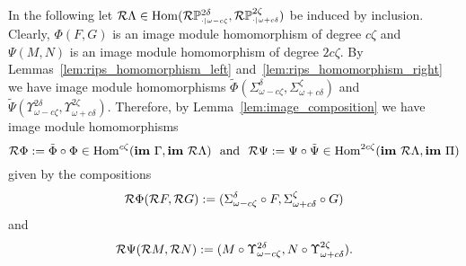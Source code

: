 In the following let $\mathcal{R}\Lambda\in\mathrm{Hom}(\mathcal{R}\mathbb{P}_{\scriptscriptstyle \cdot\mid \omega-c\zeta}^{2\delta},\mathcal{R}\mathbb{P}_{\scriptscriptstyle \cdot\mid \omega+c\delta}^{2\zeta})$ be induced by inclusion.
Clearly, $\Phi(F, G)$ is an image module homomorphism of degree $c\zeta$ and $\Psi(M, N)$ is an image module homomorphism of degree $2c\zeta$.
By Lemmas~\ref{lem:rips_homomorphism_left} and~\ref{lem:rips_homomorphism_right} we have image module homomorphisms $\tilde{\Phi}(\Sigma_{\omega-c\zeta}^\delta, \Sigma_{\omega+c\delta}^\zeta)$ and $\tilde{\Psi}(\Upsilon_{\omega-c\zeta}^{2\delta}, \Upsilon_{\omega+c\delta}^{2\zeta})$.
Therefore, by Lemma~\ref{lem:image_composition} we have image module homomorphisms
\[ \rips\Phi := \tilde{\Phi}\circ\Phi\in\Hom^{c\zeta}(\im~\Gamma,\im~\rips\Lambda)\ \text{ and }\ \rips\Psi :=\Psi\circ\tilde{\Psi}\in\Hom^{2c\zeta}(\im~\rips\Lambda, \im~\Pi)\] given by the compositions
\[ \mathcal{R}\Phi(\mathcal{R} F, \mathcal{R} G) := (\Sigma_{\omega-c\zeta}^\delta\circ F, \Sigma_{\omega+c\delta}^\zeta\circ G)\]
and
\[ \mathcal{R}\Psi(\mathcal{R} M, \mathcal{R} N) := (M\circ \Upsilon_{\omega-c\zeta}^{2\delta}, N\circ\Upsilon_{\omega+c\delta}^{2\zeta}).\]

